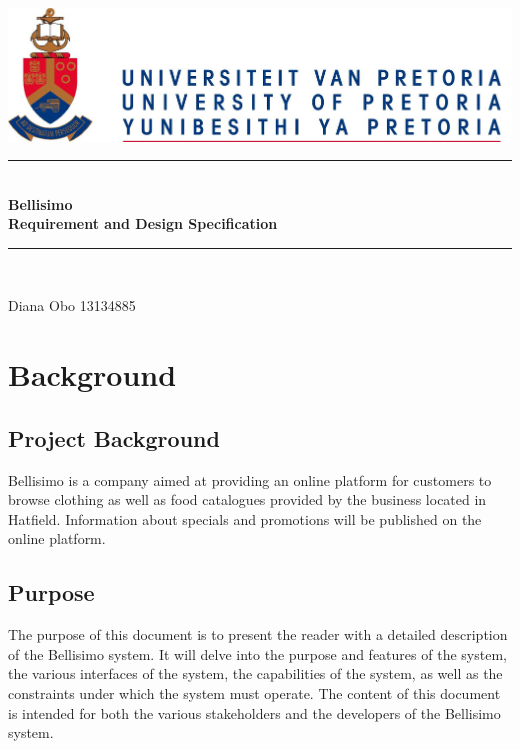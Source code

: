 \documentclass[12pt]{article}
\begin{document}
\begin{titlepage}
	
	\begin{center}
		\includegraphics[scale=1]{diagrams/up.png}\\ [1cm]
		\rule{\linewidth}{0.5mm} \\[0.4cm]
		{ \huge \bfseries Bellisimo
			 \\ [0.5cm] Requirement and Design Specification}\\[0.5cm]
		\rule{\linewidth}{0.5mm} \\[0.4cm]	
		
		\begin{minipage}{0.4\textwidth}
			\begin{flushleft} \large
				Diana {Obo}
				13134885
			\end{flushleft}
		\end{minipage}
		
	\end{center}
\end{titlepage}

\section{Background}
\subsection{Project Background}
Bellisimo is a company aimed at providing an online platform for customers to browse clothing as well as food catalogues provided by the business located in Hatfield. Information about specials and promotions will be published on the online platform.
\subsection{Purpose}
The purpose of this document is to present the reader with a detailed description of the Bellisimo system. It will delve into the purpose and features of the system, the various interfaces of the system, the capabilities of the system, as well as the constraints under which the system must operate. The content of this document is intended for both the various stakeholders and the developers of the Bellisimo system.
\end{document}
